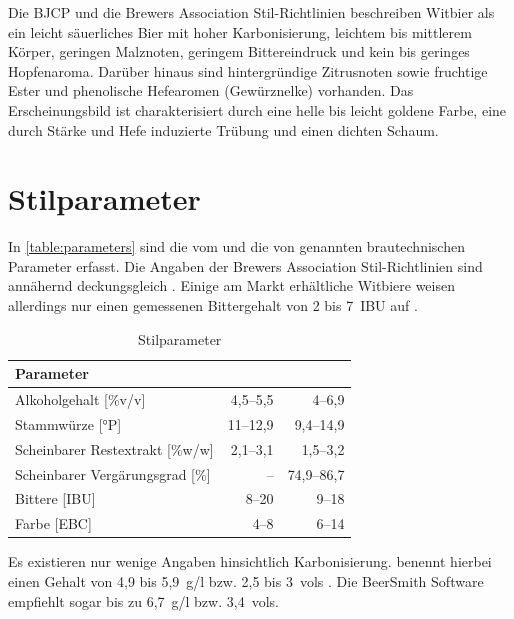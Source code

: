 \documentclass[a4paper,parskip=half]{scrartcl}
\begin{document}
Die BJCP und die Brewers Association Stil-Richtlinien beschreiben
Witbier als ein leicht säuerliches Bier mit hoher Karbonisierung,
leichtem bis mittlerem Körper, geringen Malznoten, geringem Bittereindruck
und kein bis geringes Hopfenaroma. Darüber hinaus sind hintergründige
Zitrusnoten sowie fruchtige Ester und phenolische Hefearomen (Gewürznelke)
vorhanden. Das Erscheinungsbild ist charakterisiert durch eine helle
bis leicht goldene Farbe, eine durch Stärke und Hefe induzierte Trübung
und einen dichten Schaum. \parencites[48\psq]{BJCP2015}[24]{BA2021}

\section*{Stilparameter}

In \autoref{table:parameters} sind die vom \citeauthor{BJCP2015} und die von
\citeauthor{Strottner1999} genannten brautechnischen Parameter erfasst.
Die Angaben der Brewers Association Stil-Richtlinien sind annähernd
deckungsgleich \parencites[24]{BA2021}. Einige am Markt erhältliche
Witbiere weisen allerdings nur einen gemessenen Bittergehalt von
2 bis 7~IBU auf \parencite[96-121]{Roncoroni2018}.

\begin{table}[H]
\centering
\begin{tabular}{lrr}
\toprule
Parameter                       & \citeauthor{BJCP2015} & \citeauthor{Strottner1999} \\
\midrule
Alkoholgehalt [\%v/v]           & 4,5–5,5 & 4–6,9 \\
Stammwürze [°P]                 & 11–12,9 & 9,4–14,9 \\
Scheinbarer Restextrakt [\%w/w] & 2,1–3,1 & 1,5–3,2 \\
Scheinbarer Vergärungsgrad [\%] & –       & 74,9–86,7 \\
Bittere [IBU]                   & 8–20    & 9–18 \\
Farbe [EBC]                     & 4–8     & 6–14 \\
\bottomrule
\end{tabular}
\caption{Stilparameter \parencites[49]{BJCP2015}[23-113]{Strottner1999}}
\label{table:parameters}
\end{table}

Es existieren nur wenige Angaben hinsichtlich Karbonisierung.
\citeauthor{Zainasheff2007} benennt hierbei einen  Gehalt von
4,9 bis 5,9~g/l bzw. 2,5 bis 3~vols \parencite{Zainasheff2007}.
Die BeerSmith Software empfiehlt sogar bis zu 6,7~g/l bzw. 3,4~vols.
\end{document}
